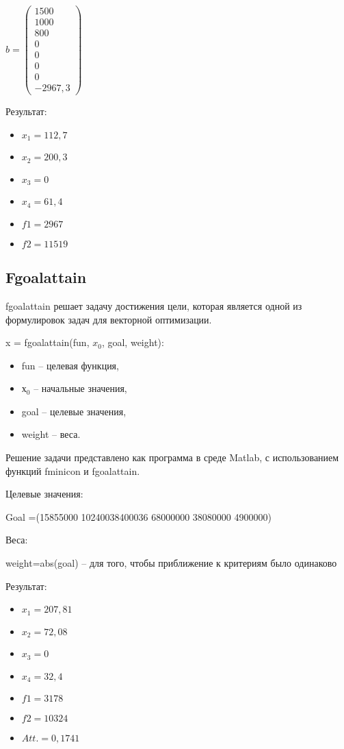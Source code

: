$b =
\begin{pmatrix}
  1500 \\
  1000 \\
  800 \\
  0 \\
  0 \\
  0 \\
  0 \\
  -2967,3
\end{pmatrix}$

Результат:
\begin{itemize}
\item $x_1 = 112,7$
\item $x_2 = 200,3$
\item $x_3 = 0$
\item $x_4 = 61,4$
\item $f1 = 2967$
\item $f2 = 11519$
\end{itemize}

\subsection{Fgoalattain}

fgoalattain решает задачу достижения цели, которая является одной из формулировок задач для векторной оптимизации.

x = fgoalattain(fun, $x_0$, goal, weight):
\begin{itemize}
\item fun -- целевая функция, 
\item $х_0$ -- начальные значения,
\item goal -- целевые значения,
\item weight -- веса.
\end{itemize}

Решение задачи представлено как программа в среде Matlab, с использованием функций fminicon и fgoalattain.

Целевые значения:

Goal =(15855000 10240038400036 68000000 38080000 4900000) 

\newpage
Веса:

weight=abs(goal) -- для того, чтобы приближение к критериям было одинаково



Результат:
\begin{itemize}
\item $x_1 = 207,81$
\item $x_2 = 72,08$
\item $x_3 = 0$
\item $x_4 = 32,4$
\item $f1 = 3178$
\item $f2 = 10324$
\item $Att. = 0,1741$
\end{itemize}


